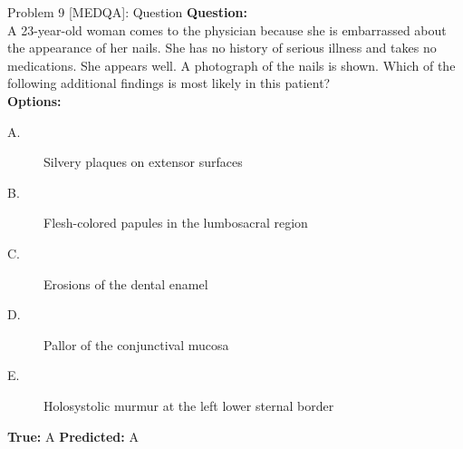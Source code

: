 \documentclass{beamer}
\newcommand{\cmark}{\textcolor{green!60!black}{\ding{51}}}
\begin{document}
\begin{frame}{Problem 9 [MEDQA]: Question}
    \textbf{Question:}\\[4pt]
    \small A 23-year-old woman comes to the physician because she is embarrassed about the appearance
of her nails. She has no history of serious illness and takes no medications. She appears
well. A photograph of the nails is shown. Which of the following additional findings is
most likely in this patient?\\[6pt]
    \vspace{2pt}\textbf{Options:}\\[2pt]
    \begin{description}
      \item[A.] Silvery plaques on extensor surfaces
      \item[B.] Flesh-colored papules in the lumbosacral region
      \item[C.] Erosions of the dental enamel
      \item[D.] Pallor of the conjunctival mucosa
      \item[E.] Holosystolic murmur at the left lower sternal border
    \end{description}
    \vspace{6pt}
    \textbf{True:} A \quad \textbf{Predicted:} A \quad \cmark
\end{frame}
\end{document}
